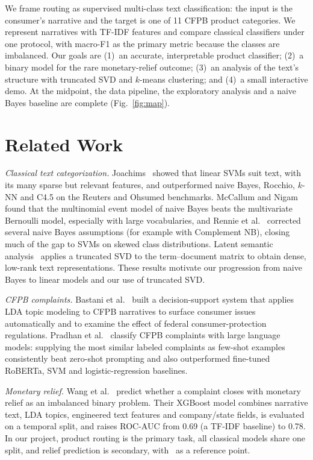 \documentclass[conference]{IEEEtran}
\begin{document}
We frame routing as supervised multi-class text classification: the input is the consumer's narrative and the target is one of 11 CFPB product categories. We represent narratives with TF-IDF features and compare classical classifiers under one protocol, with macro-F1 as the primary metric because the classes are imbalanced. Our goals are (1)~an accurate, interpretable product classifier; (2)~a binary model for the rare monetary-relief outcome; (3)~an analysis of the text's structure with truncated SVD and $k$-means clustering; and (4)~a small interactive demo. At the midpoint, the data pipeline, the exploratory analysis and a naive Bayes baseline are complete (Fig.~\ref{fig:map}).

\section{Related Work}
\textit{Classical text categorization.} Joachims~\cite{joachims} showed that linear SVMs suit text, with its many sparse but relevant features, and outperformed naive Bayes, Rocchio, $k$-NN and C4.5 on the Reuters and Ohsumed benchmarks. McCallum and Nigam~\cite{mccallum} found that the multinomial event model of naive Bayes beats the multivariate Bernoulli model, especially with large vocabularies, and Rennie et al.~\cite{rennie} corrected several naive Bayes assumptions (for example with Complement NB), closing much of the gap to SVMs on skewed class distributions. Latent semantic analysis~\cite{lsa} applies a truncated SVD to the term--document matrix to obtain dense, low-rank text representations. These results motivate our progression from naive Bayes to linear models and our use of truncated SVD.

\textit{CFPB complaints.} Bastani et al.~\cite{bastani} built a decision-support system that applies LDA topic modeling to CFPB narratives to surface consumer issues automatically and to examine the effect of federal consumer-protection regulations. Pradhan et al.~\cite{pradhan} classify CFPB complaints with large language models: supplying the most similar labeled complaints as few-shot examples consistently beat zero-shot prompting and also outperformed fine-tuned RoBERTa, SVM and logistic-regression baselines.

\textit{Monetary relief.} Wang et al.~\cite{wang} predict whether a complaint closes with monetary relief as an imbalanced binary problem. Their XGBoost model combines narrative text, LDA topics, engineered text features and company/state fields, is evaluated on a temporal split, and raises ROC-AUC from 0.69 (a TF-IDF baseline) to 0.78. In our project, product routing is the primary task, all classical models share one split, and relief prediction is secondary, with~\cite{wang} as a reference point.
\end{document}
